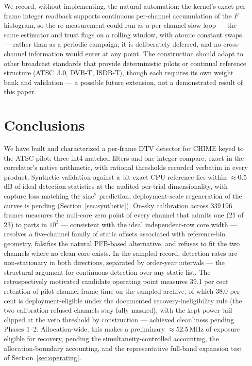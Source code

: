 We record, without implementing, the natural automation: the kernel's
exact per-frame integer readback supports continuous per-channel
accumulation of the $F$ histogram, so the re-measurement could run as
a per-channel slow loop --- the same estimator and trust flags on a
rolling window, with atomic constant swaps --- rather than as a
periodic campaign; it is deliberately deferred, and no cross-channel
information would enter at any point. The construction should
adapt to other broadcast standards that provide deterministic pilots or
continual reference structure (ATSC~3.0, DVB-T, ISDB-T), though each
requires its own weight bank and validation --- a possible future
extension, not a demonstrated result of this paper.

\section{Conclusions}
\label{sec:conclusions}

We have built and characterized a per-frame DTV detector for CHIME keyed
to the ATSC pilot: three int4 matched filters and one integer compare,
exact in the correlator's native arithmetic, with rational thresholds
recorded verbatim in every product. Synthetic validation against a
bit-exact CPU reference lies within $\approx$0.5\,dB of ideal detection
statistics at the audited per-trial dimensionality, with capture loss
matching the $\mathrm{sinc}^2$ prediction; deployment-scale regeneration
of the curves is pending (Section~\ref{sec:synthetic}). On-sky calibration across 339\,196 frames
measures the null-core zero point of every channel that admits one (21 of
23) to parts in $10^{3}$ --- consistent with the ideal
independent-row core width --- resolves a five-channel family of static
offsets associated with reference-bin geometry, falsifies the natural
PFB-based alternative, and refuses to fit the two channels where no clean
core exists. In the sampled record, detection rates are non-stationary in
both directions, separated by order-year intervals --- the structural
argument for continuous detection over any static list.
The retrospectively motivated candidate operating point measures 39.1
per cent retention of pilot-channel frame-time on the sampled archive,
of which 38.0 per cent is deployment-eligible under the documented
recovery-ineligibility rule (the two calibration-refused channels stay
fully masked), with the kept power tail
clipped at the veto threshold by construction --- achieved cleanliness
pending Phases 1--2.
Allocation-wide, this makes a preliminary $\approx$52.5\,MHz of exposure
eligible for recovery, pending the simultaneity-controlled accounting,
the allocation-boundary accounting, and the representative full-band
expansion test of Section~\ref{sec:operating}.

